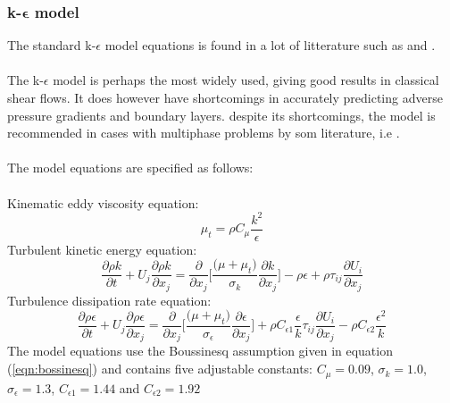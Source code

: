 \documentclass[a4paper, 12pt]{report}
\begin{document}
\subsubsection{k-$\boldsymbol{\epsilon}$ model}
The standard k-$\epsilon$ model equations is found in a lot of litterature such as \cite{CFD} and \cite{UNIK4900}.\\
\\
The k-$\epsilon$ model is perhaps the most widely used, giving good results in classical shear flows. It does however have shortcomings in accurately predicting adverse pressure gradients and boundary layers. despite its shortcomings, the model is recommended in cases with multiphase problems by som literature, i.e \cite{AppliedMathematicalModelling}.\\
\\ 
The model equations are specified as follows:\\
\\
Kinematic eddy viscosity equation:
\begin{equation}
\mu_t = \rho C_{\mu}\frac{k^2}{\epsilon}
\label{eqn:nutKEpsilon}
\end{equation}
Turbulent kinetic energy equation:
\begin{equation}
\frac{\partial \rho k}{\partial t} + U_j \frac{\partial \rho k}{\partial x_j} = \frac{\partial}{\partial x_j}\Big[\frac{\big( \mu + \mu_t\big)}{\sigma_k}\frac{\partial k}{\partial x_j}\Big] - \rho \epsilon + \rho\tau_{ij}\frac{\partial U_i}{\partial x_j}
\label{eqn:kInKEpsilon}
\end{equation}
Turbulence dissipation rate equation:
\begin{equation}
\frac{\partial \rho \epsilon }{\partial t} + U_j\frac{\partial \rho \epsilon}{\partial x_j} =\frac{\partial }{\partial x_j}\Big[\frac{\big(\mu + \mu_t\big)}{\sigma_{\epsilon}}\frac{\partial \epsilon}{\partial x_j} \Big]  + \rho C_{\epsilon 1}\frac{\epsilon}{k}\tau_{ij}\frac{\partial U_i}{\partial x_j} - \rho C_{\epsilon 2} \frac{\epsilon ^2}{k}
\label{eqn:epsilonInKEpsilon}
\end{equation}
The model equations use the Boussinesq assumption given in equation (\ref{eqn:bossinesq}) and contains five adjustable constants: $C_{\mu}=0.09$, $\sigma_k=1.0$, $\sigma_{\epsilon}= 1.3$, $C_{\epsilon 1}=1.44$ and $C_{\epsilon 2}=1.92$
\end{document}
